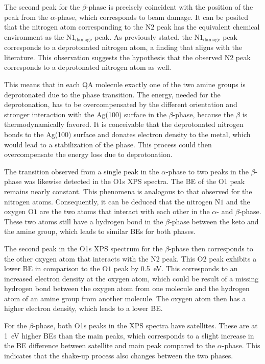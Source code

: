 The second peak for the $\beta$-phase is precisely coincident with the position of the peak from the $\alpha$-phase, which corresponds to beam damage. It can be posited that the nitrogen atom corresponding to the $\mathrm{N2}$ peak has the equivalent chemical environment as the $\mathrm{N1_{damage}}$ peak. As previously stated, the $\mathrm{N1_{damage}}$ peak corresponds to a deprotonated nitrogen atom, a finding that aligns with the literature.\autocite{Kang1990, Ruano2021} This observation suggests the hypothesis that the observed $\mathrm{N2}$ peak corresponds to a deprotonated nitrogen atom as well.

This means that in each \ac{QA} molecule exactly one of the two amine groups is deprotonated due to the phase transition. The energy, needed for the deprotonation, has to be overcompensated by the different orientation and stronger interaction with the Ag(100) surface in the $\beta$-phase, because the $\beta$ is thermodynamically favored.\autocite{Humberg2024} It is conceivable that the deprotonated nitrogen bonds to the Ag(100) surface and donates electron density to the metal, which would lead to a stabilization of the phase. This process could then overcompensate the energy loss due to deprotonation.

The transition observed from a single peak in the $\alpha$-phase to two peaks in the $\beta$-phase was likewise detected in the O1s \ac{XPS} spectra. The \ac{BE} of the $\mathrm{O1}$ peak remains nearly constant. This phenomena is analogous to that observed for the nitrogen atoms. Consequently, it can be deduced that the nitrogen $\mathrm{N1}$ and the oxygen $\mathrm{O1}$ are the two atoms that interact with each other in the $\alpha$- and $\beta$-phase. These two atoms still have a hydrogen bond in the $\beta$-phase between the keto and the amine group, which leads to similar \acp{BE} for both phases.

The second peak in the O1s \ac{XPS} spectrum for the $\beta$-phase then corresponds to the other oxygen atom that interacts with the $\mathrm{N2}$ peak. This $\mathrm{O2}$ peak exhibits a lower \ac{BE} in comparison to the $\mathrm{O1}$ peak by 0.5~\si{\eV}. This corresponds to an increased electron density at the oxygen atom, which could be result of a missing hydrogen bond between the oxygen atom from one molecule and the hydrogen atom of an amine group from another molecule. The oxygen atom then has a higher electron density, which leads to a lower \ac{BE}.

For the $\beta$-phase, both O1s peaks in the \ac{XPS} spectra have satellites. These are at 1~\si{\eV} higher \acp{BE} than the main peaks, which corresponds to a slight increase in the \ac{BE} difference between satellite and main peak compared to the $\alpha$-phase. This indicates that the shake-up process also changes between the two phases.

